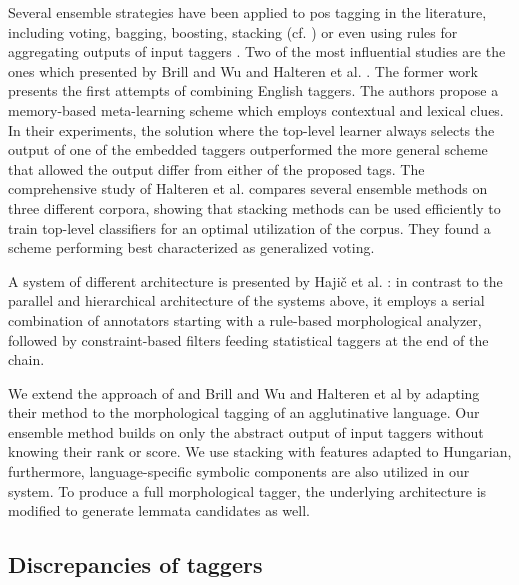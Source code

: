 Several ensemble strategies have been applied to \acrshort{pos} tagging in the literature, including voting, bagging, boosting, stacking (cf. \cite{Brill1998,Halteren2001,Kuba2004,Osterskov2009Italian,Pascal2012polish,Iliadis2012arabic}) or even using rules for aggregating outputs of input taggers \cite{Borin00somethingborrowed}.
Two of the most influential studies are the ones which presented by Brill and Wu \cite{Brill1998} and Halteren et al. \cite{Halteren2001}.
The former work presents the first attempts of combining English taggers.
The authors propose a memory-based meta-learning scheme which employs contextual and lexical clues.
In their experiments, the solution where the top-level learner always selects the output of one of the embedded taggers outperformed the more general scheme that allowed the output differ from either of the proposed tags.
The comprehensive study of Halteren et al. \cite{Halteren2001} compares several ensemble methods on three different corpora, showing that stacking methods can be used efficiently to train top-level classifiers for an optimal utilization of the corpus.
They found a scheme performing best characterized as generalized voting.

A system of different architecture is presented by Hajič et al. \cite{Hajic2001}: in contrast to the parallel and hierarchical architecture of the systems above, it employs a serial combination of annotators starting with a rule-based morphological analyzer, followed by constraint-based filters feeding statistical taggers at the end of the chain. 


We extend the approach of and Brill and Wu \cite{Brill1998} and Halteren et al \cite{Halteren2001} by adapting their method to the morphological tagging of an agglutinative language. 
Our ensemble method builds on only the abstract output of input taggers without knowing their rank or score.
We use stacking with features adapted to Hungarian, furthermore, language-specific symbolic components are also utilized in our system.
To produce a full morphological tagger, the underlying architecture is modified to generate lemmata candidates as well.

\subsection{Discrepancies of taggers}

